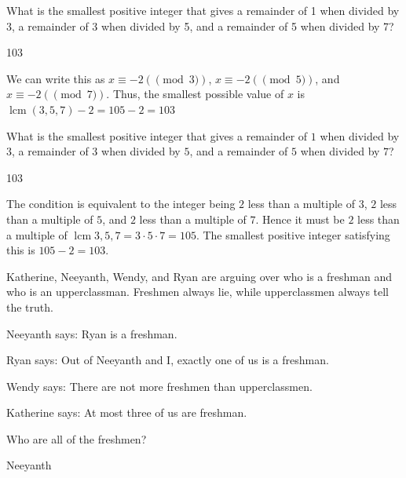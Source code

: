 \documentclass[11pt]{article}
\DeclareMathOperator{\lcm}{lcm}
\begin{document}
\begin{problem}
 What is the smallest positive integer that gives a remainder of 1 when divided by 3, a remainder of 3 when divided by 5, and a remainder of 5 when divided by 7?
\end{problem}

\begin{answer}
103
\end{answer}

\begin{solution}
We can write this as $x \equiv -2 (\pmod 3)$, $x \equiv -2 (\pmod 5)$, and $x \equiv -2 (\pmod 7)$. Thus, the smallest possible value of $x$ is $\lcm (3, 5, 7) - 2 = 105-2 = \boxed{103}$
\end{solution}


\begin{problem}
What is the smallest positive integer that gives a remainder of $1$ when divided by $3$, a remainder of $3$ when divided by $5$, and
a remainder of $5$ when divided by $7$?
\end{problem}

\begin{answer}
103
\end{answer}

\begin{solution}
The condition is equivalent to the integer being $2$ less than a multiple of $3$, $2$ less than a multiple of $5$, and $2$ less than a multiple
of $7$. Hence it must be $2$ less than a multiple of $\lcm{3, 5, 7} = 3 \cdot 5 \cdot 7 = 105$. The smallest positive integer satisfying
this is $105 - 2 = \boxed{103}$.
\end{solution}


\begin{problem}
Katherine, Neeyanth, Wendy, and Ryan are arguing over who is a freshman and who is an upperclassman. Freshmen always lie, while upperclassmen always tell the truth. 
    
Neeyanth says: Ryan is a freshman.
    
Ryan says: Out of Neeyanth and I, exactly one of us is a freshman.

Wendy says: There are not more freshmen than upperclassmen.
    
Katherine says: At most three of us are freshman.
    
\noindent Who are all of the freshmen? %
\end{problem}

\begin{answer}
Neeyanth
\end{answer}
\end{document}
